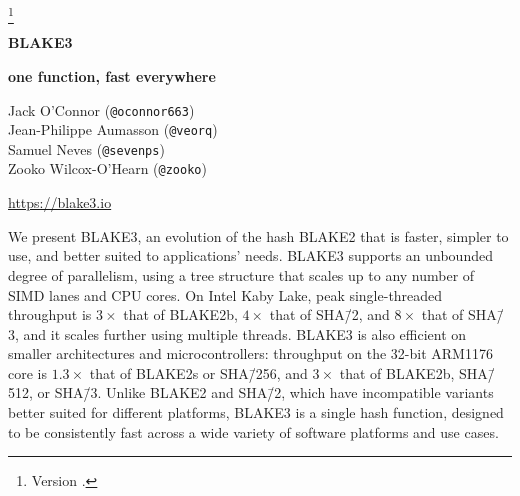 \documentclass[12pt,notitlepage,a4paper]{article}
\title{\mytitle}
\newcommand{\mytitle}{BLAKE3}
\begin{document}
\selectfont
\pagestyle{plain}

\let\thefootnote\relax\footnote{Version \texttt{\pdfdate}.}
\addtocounter{footnote}{-1}\let\thefootnote\svthefootnote

\begin{center}
{\Huge \bf \mytitle}

\medskip

{\Large \bf  one function, fast everywhere}

\medskip

Jack O'Connor (\texttt{@oconnor663}) \\
Jean-Philippe Aumasson (\texttt{@veorq}) \\
Samuel Neves (\texttt{@sevenps}) \\
Zooko Wilcox-O'Hearn (\texttt{@zooko}) \\

\medskip

{\large \url{https://blake3.io}}

\end{center}


\medskip

\begin{center}
  \begin{minipage}{0.92\linewidth}

      We present BLAKE3, an evolution of the hash BLAKE2 that is faster,
      simpler to use, and better suited to applications' needs.
      BLAKE3 supports an unbounded degree of parallelism, using a tree
      structure that scales up to any number of SIMD lanes and CPU
      cores.  
      On Intel Kaby Lake, peak single-threaded throughput is $3\times$
      that of BLAKE2b, $4\times$ that of SHA\=/2, and $8\times$ that of
      SHA\=/3, and it scales further using multiple threads. 
      BLAKE3 is also efficient on smaller architectures and
      microcontrollers: throughput on the 32-bit ARM1176 core is
      $1.3\times$ that of BLAKE2s or SHA\=/256, and $3\times$ that of
      BLAKE2b, SHA\=/512, or SHA\=/3. 
      Unlike BLAKE2 and SHA\=/2, which have incompatible variants better
      suited for different platforms, BLAKE3 is a single hash function,
      designed to be consistently fast across a wide variety of software
      platforms and use cases.

   \end{minipage}
\end{center}

\newpage

\tableofcontents
\end{document}
